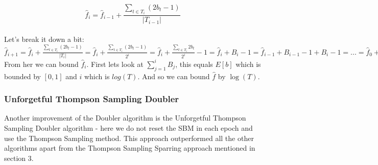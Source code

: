 \documentclass{llncs}
\begin{document}
        $$\hat{f}_i=\hat{f}_{i-1} + \frac{\sum\limits_{t\in T_i} (2b_t -1)}{|T_{i-1}|}$$
		\\		
		Let's break it down a bit:\\
		$\hat{f}_{i+1}=\hat{f}_{i} + 
		\frac{\sum\limits_{t\in T_i} (2b_t -1)}{|T_{i}|} = 
		\hat{f}_{i} + 
		\frac{\sum\limits_{t\in T_i} (2b_t -1)}{2^{i}} = 
		\hat{f}_{i} + 
		\frac{\sum\limits_{t\in T_i} 2b_t}{2^{i}}-1 = 
		\hat{f}_{i} + B_i -1 =  
		\hat{f}_{i-1} +B_{i-1} -1+ B_i -1 = ... =  
		\hat{f}_{0} + \sum\limits_{j=1}^i B_{j}+i$
		\\
		From her we can bound $\hat{f}_{i}$.
		First lets look at $\sum\limits_{j=1}^i B_{j}$, this equals $E[b]$ which is bounded by $[0,1]$ and $i$ which is $log(T)$. And so we can bound $\hat{f}$ by $\log(T)$.

				
	\subsubsection{Unforgetful Thompson Sampling Doubler}
		Another improvement of the Doubler algorithm is the Unforgetful Thompson Sampling Doubler algorithm - here we do not reset the SBM in each epoch and use the Thompson Sampling method. This approach outperformed all the other algorithms apart from the Thompson Sampling Sparring approach mentioned in section 3.

		
		
		\newpage	
\end{document}
